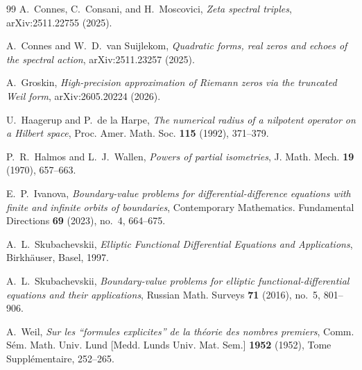 \documentclass[11pt,a4paper]{article}
\theoremstyle{plain}
\theoremstyle{definition}
\theoremstyle{remark}
\begin{document}
\begin{thebibliography}{99}
A.~Connes, C.~Consani, and H.~Moscovici,
\emph{Zeta spectral triples},
arXiv:2511.22755 (2025).

A.~Connes and W.~D.~van Suijlekom,
\emph{Quadratic forms, real zeros and echoes of the spectral action},
arXiv:2511.23257 (2025).

A.~Groskin,
\emph{High-precision approximation of Riemann zeros via the truncated Weil form},
arXiv:2605.20224 (2026).

U.~Haagerup and P.~de la Harpe,
\emph{The numerical radius of a nilpotent operator on a Hilbert space},
Proc. Amer. Math. Soc. \textbf{115} (1992), 371--379.

P.~R.~Halmos and L.~J.~Wallen,
\emph{Powers of partial isometries},
J. Math. Mech. \textbf{19} (1970), 657--663.

E.~P.~Ivanova,
\emph{Boundary-value problems for differential-difference equations with finite and infinite orbits of boundaries},
Contemporary Mathematics. Fundamental Directions \textbf{69} (2023), no.~4, 664--675.

A.~L.~Skubachevskii,
\emph{Elliptic Functional Differential Equations and Applications},
Birkh\"auser, Basel, 1997.

A.~L.~Skubachevskii,
\emph{Boundary-value problems for elliptic functional-differential equations and their applications},
Russian Math. Surveys \textbf{71} (2016), no.~5, 801--906.

A.~Weil,
\emph{Sur les ``formules explicites'' de la th\'eorie des nombres premiers},
Comm. S\'em. Math. Univ. Lund [Medd. Lunds Univ. Mat. Sem.] \textbf{1952} (1952), Tome Suppl\'ementaire, 252--265.
\end{thebibliography}
\end{document}
